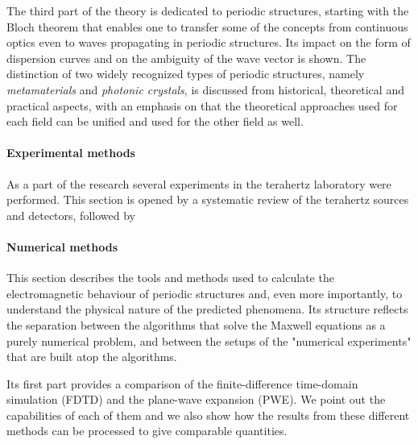 The third part of the theory is dedicated to periodic structures, starting with the Bloch theorem that enables one to transfer some of the concepts from continuous optics even to waves propagating in periodic structures. Its impact on the form of dispersion curves and on the ambiguity of the wave vector is shown.
The distinction of two widely recognized types of periodic structures, namely \textit{metamaterials} and \textit{photonic crystals}, is discussed from historical, theoretical and practical aspects, with an emphasis on that the theoretical approaches used for each field can be unified and used for the other field as well.

\paragraph{Experimental methods} %
As a part of the research several experiments in the terahertz laboratory were performed. This section is opened by a systematic review of the terahertz sources and detectors, followed by 



\paragraph{Numerical methods} %
This section describes the tools and methods used to calculate the electromagnetic behaviour of periodic structures and, even more importantly, to understand the physical nature of the predicted phenomena. Its structure reflects the separation between the algorithms that solve the Maxwell equations as a purely numerical problem, and between the setups of the "numerical experiments" that are built atop the algorithms.

Its first part provides a comparison of the finite-difference time-domain simulation (FDTD) 
and the plane-wave expansion (PWE).
We point out the capabilities of each of them and we also show how the results from these different methods can be processed to give comparable quantities.

